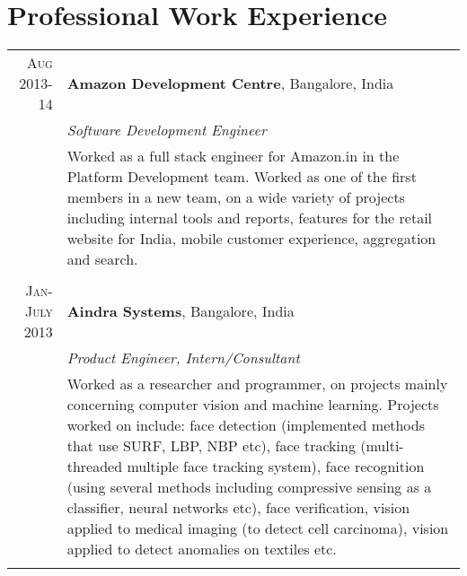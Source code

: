 \documentclass[a4paper,10pt]{article}
\begin{document}
\section{Professional Work Experience}
\begin{tabular}{r|p{11cm}}
\textsc{Aug 2013-14}& \textbf{Amazon Development Centre}, Bangalore, India \\&\emph{Software Development Engineer}\\&\footnotesize{Worked as a full stack engineer for Amazon.in in the Platform Development team. Worked as one of the first members in a new team, on a wide variety of projects including internal tools and reports, features for the retail website for India, mobile customer experience, aggregation and search.}\\\multicolumn{2}{c}{} \\
 \textsc{Jan-July 2013} & \textbf{Aindra Systems}, Bangalore, India \\&\emph{Product Engineer, Intern/Consultant}\\&\footnotesize{Worked as a researcher and programmer, on projects mainly concerning computer vision and machine learning. Projects worked on include: face detection (implemented methods that use SURF, LBP, NBP etc), face tracking (multi-threaded multiple face tracking system), face recognition (using several methods including compressive sensing as a classifier, neural networks etc), face verification, vision applied to medical imaging (to detect cell carcinoma), vision applied to detect anomalies on textiles etc.}\\\multicolumn{2}{c}{}
\end{tabular}

\end{document}
